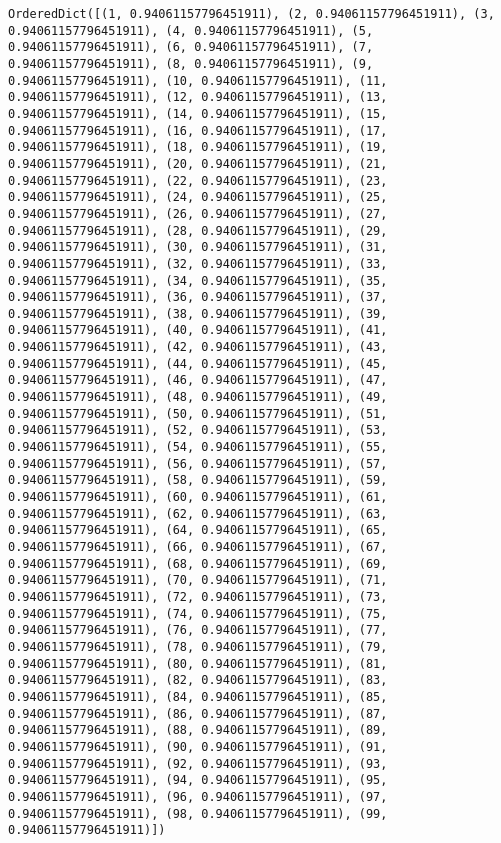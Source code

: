 \documentclass[11pt]{article}
\begin{document}
\begin{Verbatim}[commandchars=\\\{\}]
OrderedDict([(1, 0.94061157796451911), (2, 0.94061157796451911), (3, 0.94061157796451911), (4, 0.94061157796451911), (5, 0.94061157796451911), (6, 0.94061157796451911), (7, 0.94061157796451911), (8, 0.94061157796451911), (9, 0.94061157796451911), (10, 0.94061157796451911), (11, 0.94061157796451911), (12, 0.94061157796451911), (13, 0.94061157796451911), (14, 0.94061157796451911), (15, 0.94061157796451911), (16, 0.94061157796451911), (17, 0.94061157796451911), (18, 0.94061157796451911), (19, 0.94061157796451911), (20, 0.94061157796451911), (21, 0.94061157796451911), (22, 0.94061157796451911), (23, 0.94061157796451911), (24, 0.94061157796451911), (25, 0.94061157796451911), (26, 0.94061157796451911), (27, 0.94061157796451911), (28, 0.94061157796451911), (29, 0.94061157796451911), (30, 0.94061157796451911), (31, 0.94061157796451911), (32, 0.94061157796451911), (33, 0.94061157796451911), (34, 0.94061157796451911), (35, 0.94061157796451911), (36, 0.94061157796451911), (37, 0.94061157796451911), (38, 0.94061157796451911), (39, 0.94061157796451911), (40, 0.94061157796451911), (41, 0.94061157796451911), (42, 0.94061157796451911), (43, 0.94061157796451911), (44, 0.94061157796451911), (45, 0.94061157796451911), (46, 0.94061157796451911), (47, 0.94061157796451911), (48, 0.94061157796451911), (49, 0.94061157796451911), (50, 0.94061157796451911), (51, 0.94061157796451911), (52, 0.94061157796451911), (53, 0.94061157796451911), (54, 0.94061157796451911), (55, 0.94061157796451911), (56, 0.94061157796451911), (57, 0.94061157796451911), (58, 0.94061157796451911), (59, 0.94061157796451911), (60, 0.94061157796451911), (61, 0.94061157796451911), (62, 0.94061157796451911), (63, 0.94061157796451911), (64, 0.94061157796451911), (65, 0.94061157796451911), (66, 0.94061157796451911), (67, 0.94061157796451911), (68, 0.94061157796451911), (69, 0.94061157796451911), (70, 0.94061157796451911), (71, 0.94061157796451911), (72, 0.94061157796451911), (73, 0.94061157796451911), (74, 0.94061157796451911), (75, 0.94061157796451911), (76, 0.94061157796451911), (77, 0.94061157796451911), (78, 0.94061157796451911), (79, 0.94061157796451911), (80, 0.94061157796451911), (81, 0.94061157796451911), (82, 0.94061157796451911), (83, 0.94061157796451911), (84, 0.94061157796451911), (85, 0.94061157796451911), (86, 0.94061157796451911), (87, 0.94061157796451911), (88, 0.94061157796451911), (89, 0.94061157796451911), (90, 0.94061157796451911), (91, 0.94061157796451911), (92, 0.94061157796451911), (93, 0.94061157796451911), (94, 0.94061157796451911), (95, 0.94061157796451911), (96, 0.94061157796451911), (97, 0.94061157796451911), (98, 0.94061157796451911), (99, 0.94061157796451911)])

\end{Verbatim}
\end{document}

